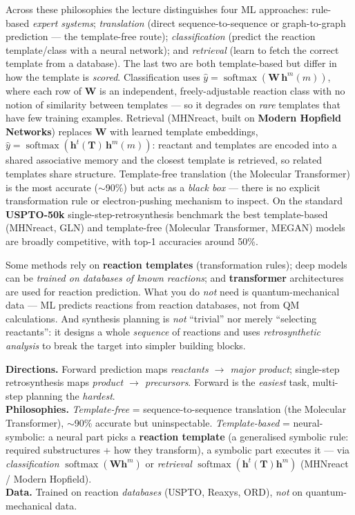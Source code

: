 \documentclass[11pt, oneside]{book}
\newcommand{\hvec}{\mathbf{h}}           %
\DeclareMathOperator{\softmax}{softmax}
\begin{document}
Across these philosophies the lecture distinguishes four ML approaches: rule-based
\emph{expert systems}; \emph{translation} (direct sequence-to-sequence or
graph-to-graph prediction --- the template-free route); \emph{classification}
(predict the reaction template/class with a neural network); and \emph{retrieval}
(learn to fetch the correct template from a database). The last two are both
template-based but differ in how the template is \emph{scored}. Classification uses
$\hat{y} = \softmax(\mathbf{W}\,\hvec^{m}(m))$, where each row of $\mathbf{W}$ is an
independent, freely-adjustable reaction class with no notion of similarity between
templates --- so it degrades on \emph{rare} templates that have few training
examples. Retrieval (MHNreact, built on \textbf{Modern Hopfield Networks}) replaces
$\mathbf{W}$ with learned template embeddings,
$\hat{y} = \softmax(\hvec^{t}(\mathbf{T})\,\hvec^{m}(m))$: reactant and templates are
encoded into a shared associative memory and the closest template is retrieved, so
related templates share structure. Template-free translation (the Molecular
Transformer) is the most accurate ($\sim$90\%) but acts as a \emph{black box} ---
there is no explicit transformation rule or electron-pushing mechanism to inspect.
On the standard \textbf{USPTO-50k} single-step-retrosynthesis benchmark the best
template-based (MHNreact, GLN) and template-free (Molecular Transformer, MEGAN)
models are broadly competitive, with top-1 accuracies around 50\%.

\begin{notebox}[title={AI for chemical reactions --- key claims}]
Some methods rely on \textbf{reaction templates} (transformation rules); deep models
can be \emph{trained on databases of known reactions}; and \textbf{transformer}
architectures are used for reaction prediction. What you do \emph{not} need is
quantum-mechanical data --- ML predicts reactions from reaction databases, not from
QM calculations. And synthesis planning is \emph{not} ``trivial'' nor merely
``selecting reactants'': it designs a whole \emph{sequence} of reactions and uses
\emph{retrosynthetic analysis} to break the target into simpler building blocks.
\end{notebox}
\begin{starbox}[title={Reaction prediction --- exam essentials}]
\textbf{Directions.} Forward prediction maps \emph{reactants $\to$ major product};
single-step retrosynthesis maps \emph{product $\to$ precursors}. Forward is the
\emph{easiest} task, multi-step planning the \emph{hardest}.\\
\textbf{Philosophies.} \emph{Template-free} = sequence-to-sequence translation (the
Molecular Transformer), $\sim$90\% accurate but uninspectable. \emph{Template-based}
= neural-symbolic: a neural part picks a \textbf{reaction template} (a generalised
symbolic rule: required substructures + how they transform), a symbolic part executes
it --- via \emph{classification} $\softmax(\mathbf{W}\hvec^{m})$ or \emph{retrieval}
$\softmax(\hvec^{t}(\mathbf{T})\hvec^{m})$ (MHNreact / Modern Hopfield).\\
\textbf{Data.} Trained on reaction \emph{databases} (USPTO, Reaxys, ORD), \emph{not}
on quantum-mechanical data.
\end{starbox}
\end{document}
